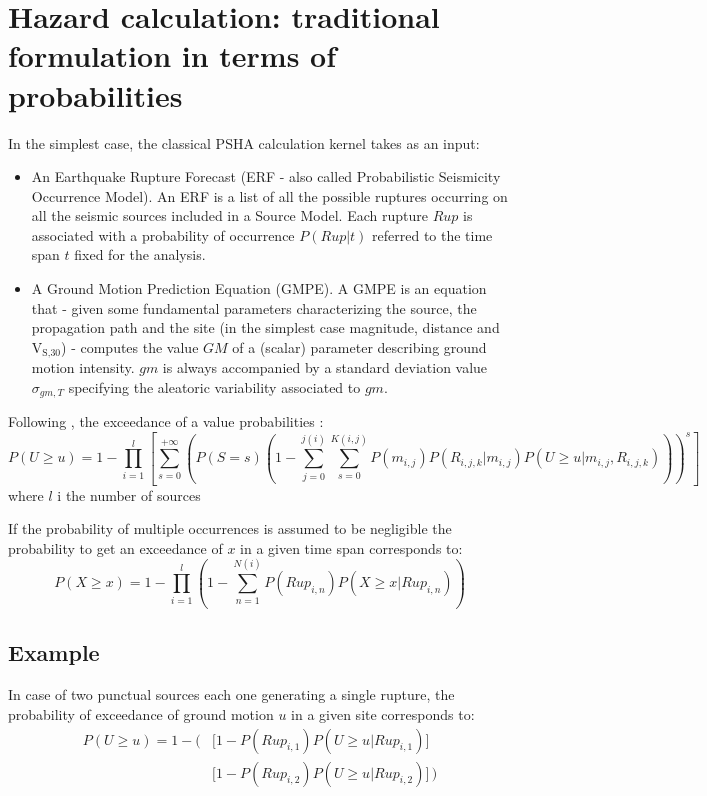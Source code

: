 \section{Hazard calculation: traditional formulation in terms of probabilities}
In the simplest case, the classical PSHA calculation kernel takes as an input: 
%
\begin{itemize}
\item An Earthquake Rupture Forecast (ERF - also called Probabilistic Seismicity Occurrence Model). An ERF is a list of all the possible ruptures occurring on all the seismic sources included in a Source Model. Each rupture $Rup$ is associated with a probability of occurrence $P(Rup|t)$ referred to the time span $t$ fixed for the analysis. 
\item A Ground Motion Prediction Equation (GMPE). A GMPE is an equation that - given some fundamental parameters characterizing the source, the propagation
path and the site (in the simplest case magnitude, distance and V$_\text{S,30}$) - computes the value $GM$ of a (scalar) parameter describing ground motion intensity. $gm$ is always accompanied by a standard deviation value $\sigma_{gm,T}$ specifying the aleatoric variability associated to $gm$.
\end{itemize}
%
Following \cite{field2003}, the exceedance of a value probabilities :
%
\begin{equation}
P(U\geq u)= 
	1-\prod\limits_{i=1}^{l} 
	\left[\sum\limits_{s=0}^{+\infty}
	\left(P(S=s) 
	\left(
		1-\sum\limits_{j=0}^{j(i)}\sum\limits_{s=0}^{K(i,j)} 
		P(m_{i,j}) 
		P(R_{i,j,k}|m_{i,j}) P(U\geq u|m_{i,j},R_{i,j,k})
	\right)
	\right)^{s}
	\right] 
\end{equation}
where $l$ i the number of sources 

If the probability of multiple occurrences is assumed to be negligible the 
probability to get an exceedance of $x$ in a given time span corresponds to:
%
\begin{equation}
P(X\geq x)=1-\prod\limits_{i=1}^{l} 
	\left( 
		1-\sum\limits_{n=1}^{N(i)}P(Rup_{i,n})P(X\geq x|Rup_{i,n})
	\right)
\end{equation}

\subsection{Example}
In case of two punctual sources each one generating a single rupture, the 
probability of exceedance of ground motion $u$ in a given site corresponds to:
%
\begin{eqnarray}
P(U\geq u)=
	1-
	\biggl(& 
		\bigl[ 1-P(Rup_{i,1})P(U\geq u|Rup_{i,1}) \bigr] \nonumber \\
		& \bigl[ 1-P(Rup_{i,2})P(U\geq u|Rup_{i,2}) \bigr]
	\,\biggr)
\end{eqnarray}